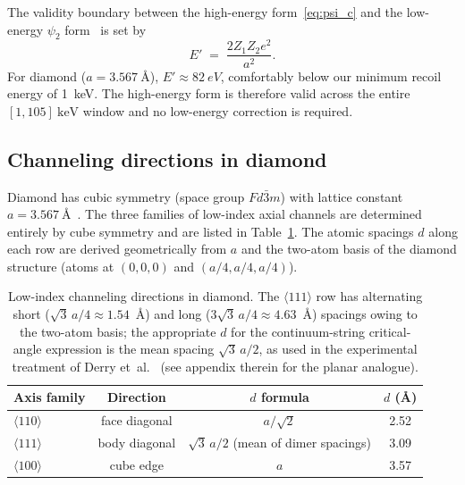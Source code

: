 \documentclass[11pt]{article}
\begin{document}
The validity boundary between the high-energy form~\eqref{eq:psi_c} and the
low-energy $\psi_2$ form~\cite[Eq.~(2.28)]{Gemmell1974} is set
by~\cite[Eq.~(2.29)]{Gemmell1974}
\begin{equation}
  E' \;=\; \frac{2 Z_1 Z_2 e^2}{a^2}.
\end{equation}
For diamond ($a = \SI{3.567}{\angstrom}$), $E' \approx \SI{82}{eV}$, comfortably
below our minimum recoil energy of \SI{1}{keV}. The high-energy form is
therefore valid across the entire $[1,105]~\mathrm{keV}$ window and no
low-energy correction is required.

\subsection{Channeling directions in diamond}

Diamond has cubic symmetry (space group $Fd\bar{3}m$) with lattice constant
$a = \SI{3.567}{\angstrom}$~\cite{Kittel}. The three families of low-index
axial channels are determined entirely by cube symmetry and are listed in
Table~\ref{tab:axes}. The atomic spacings $d$ along each row are derived
geometrically from $a$ and the two-atom basis of the diamond structure
(atoms at $(0,0,0)$ and $(a/4, a/4, a/4)$).

\begin{table}[h]
  \centering
  \begin{tabular}{lccc}
    \toprule
    Axis family & Direction & $d$ formula & $d$ (\AA) \\
    \midrule
    $\langle 110\rangle$ & face diagonal & $a/\sqrt{2}$        & 2.52 \\
    $\langle 111\rangle$ & body diagonal & $\sqrt{3}\,a/2$ (mean of dimer spacings) & 3.09 \\
    $\langle 100\rangle$ & cube edge    & $a$                  & 3.57 \\
    \bottomrule
  \end{tabular}
  \caption{Low-index channeling directions in diamond. The $\langle 111\rangle$
    row has alternating short ($\sqrt{3}\,a/4 \approx 1.54$~\AA) and long
    ($3\sqrt{3}\,a/4 \approx 4.63$~\AA) spacings owing to the two-atom basis;
    the appropriate $d$ for the continuum-string critical-angle expression is
    the mean spacing $\sqrt{3}\,a/2$, as used in the experimental
    treatment of Derry et~al.~\cite{Derry1982} (see appendix therein for the
    planar analogue).}
  \label{tab:axes}
\end{table}
\end{document}
